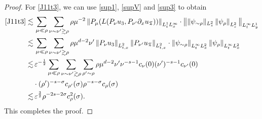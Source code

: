\documentclass[11pt,letterpaper,reqno]{amsart}
\numberwithin{equation}{section}
\theoremstyle{definition}
\theoremstyle{remark}
\begin{document}
\begin{proof}
For \eqref{J11t3},  we can use \eqref{sup1}, \eqref{supV} and \eqref{sup3} to obtain
\begin{align*}
\eqref{J11t3} \lesssim &\,	\sum_{\mu \ll \rho} \sum_{\nu\sim \nu^\prime \gtrsim \rho }      \rho  \mu^{-2}  \left\| P_\mu (L (P_\nu u_3, P_{\nu^\prime} \partial_x u_{\mathfrak{T}} )) \right\|_{L^1_{t}L^\infty_{x}} \cdot\big \|  \| \psi_{\sim\rho }  \|_{L^2_z}   \left\|   \psi_{\rho} \right\|_{L^2_z}   \big\|_{L^\infty_{t} L^1_{y}}\nonumber\\
 \lesssim &\, 	\sum_{\mu \ll \rho} \sum_{\nu\sim \nu^\prime \gtrsim \rho }    \rho  \mu^{d-2} \nu^\prime  \left\|  P_\nu   u_3 \right\|_{L^2_{t,x}} \left\|  P_{\nu^\prime}   u_{\mathfrak{T}} \right\|_{L^2_{t,x}}  \cdot \left\|  \psi_{\sim \rho } \right\|_{L^\infty_t L^2_x}   \left\|    \psi_{\rho} \right\|_{L^\infty_t L^2_x}    \nonumber\\
 \lesssim &\, \varepsilon^{-\frac{1}{2}} 	\sum_{\mu \ll \rho} \sum_{\nu\sim \nu^\prime \gtrsim \rho } \sum_{\rho^\prime \sim \rho} \rho  \mu^{d-2} \nu^\prime \nu^{-s-1} c_{\nu}(0) (\nu^\prime)^{-s-1} c_{\nu^\prime}(0)\\
 &\cdot (\rho^\prime)^{-s-\sigma} c_{\rho^\prime} (\sigma)  \rho^{-s-\sigma} c_\rho (\sigma)\\
 \lesssim &\,\varepsilon^{\frac 32} \rho^{-2s-2\sigma} c_\rho^2 (\sigma).
\end{align*}
This completes the proof.
	\end{proof}
\end{document}
